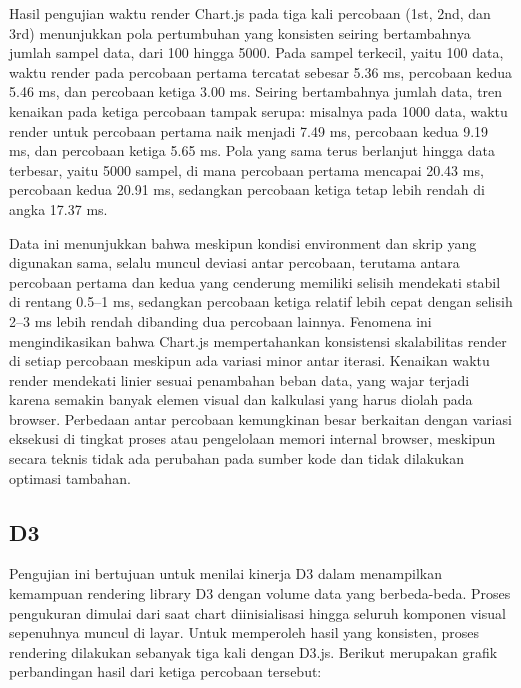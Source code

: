 Hasil pengujian waktu render Chart.js pada tiga kali percobaan (1st, 2nd, dan 3rd) menunjukkan pola pertumbuhan yang konsisten seiring bertambahnya jumlah sampel data, dari 100 hingga 5000. Pada sampel terkecil, yaitu 100 data, waktu render pada percobaan pertama tercatat sebesar 5.36 ms, percobaan kedua 5.46 ms, dan percobaan ketiga 3.00 ms. Seiring bertambahnya jumlah data, tren kenaikan pada ketiga percobaan tampak serupa: misalnya pada 1000 data, waktu render untuk percobaan pertama naik menjadi 7.49 ms, percobaan kedua 9.19 ms, dan percobaan ketiga 5.65 ms. Pola yang sama terus berlanjut hingga data terbesar, yaitu 5000 sampel, di mana percobaan pertama mencapai 20.43 ms, percobaan kedua 20.91 ms, sedangkan percobaan ketiga tetap lebih rendah di angka 17.37 ms.

Data ini menunjukkan bahwa meskipun kondisi environment dan skrip yang digunakan sama, selalu muncul deviasi antar percobaan, terutama antara percobaan pertama dan kedua yang cenderung memiliki selisih mendekati stabil di rentang 0.5–1 ms, sedangkan percobaan ketiga relatif lebih cepat dengan selisih 2–3 ms lebih rendah dibanding dua percobaan lainnya. Fenomena ini mengindikasikan bahwa Chart.js mempertahankan konsistensi skalabilitas render di setiap percobaan meskipun ada variasi minor antar iterasi. Kenaikan waktu render mendekati linier sesuai penambahan beban data, yang wajar terjadi karena semakin banyak elemen visual dan kalkulasi yang harus diolah pada browser. Perbedaan antar percobaan kemungkinan besar berkaitan dengan variasi eksekusi di tingkat proses atau pengelolaan memori internal browser, meskipun secara teknis tidak ada perubahan pada sumber kode dan tidak dilakukan optimasi tambahan.

\subsection{D3}
Pengujian ini bertujuan untuk menilai kinerja D3 dalam menampilkan kemampuan rendering library D3 dengan volume data yang berbeda-beda. Proses pengukuran dimulai dari saat chart diinisialisasi hingga seluruh komponen visual sepenuhnya muncul di layar. Untuk memperoleh hasil yang konsisten, proses rendering dilakukan sebanyak tiga kali dengan D3.js. Berikut merupakan grafik perbandingan hasil dari ketiga percobaan tersebut:

